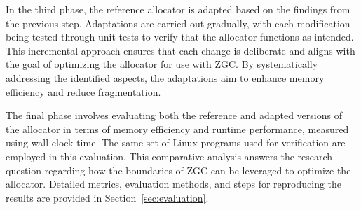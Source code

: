 In the third phase, the reference allocator is adapted based on the findings from the previous step. Adaptations are carried out gradually, with each modification being tested through unit tests to verify that the allocator functions as intended. This incremental approach ensures that each change is deliberate and aligns with the goal of optimizing the allocator for use with ZGC. By systematically addressing the identified aspects, the adaptations aim to enhance memory efficiency and reduce fragmentation.

The final phase involves evaluating both the reference and adapted versions of the allocator in terms of memory efficiency and runtime performance, measured using wall clock time. The same set of Linux programs used for verification are employed in this evaluation. This comparative analysis answers the research question regarding how the boundaries of ZGC can be leveraged to optimize the allocator. Detailed metrics, evaluation methods, and steps for reproducing the results are provided in Section~\ref{sec:evaluation}.

